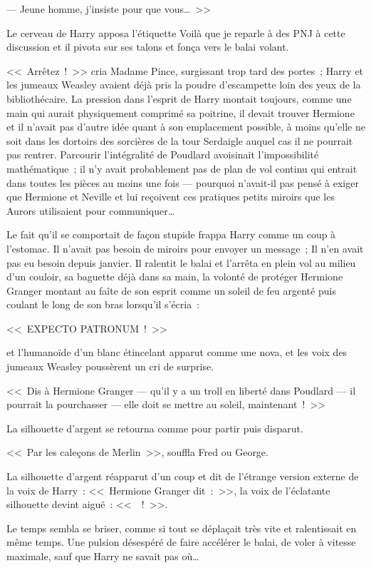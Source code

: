 --- Jeune homme, j'insiste pour que vous…~>>

Le cerveau de Harry apposa l'étiquette Voilà que je reparle à des PNJ à cette discussion et il pivota sur ses talons et fonça vers le balai volant.

<<~Arrêtez~!~>> cria Madame Pince, surgissant trop tard des portes~; Harry et les jumeaux Weasley avaient déjà pris la poudre d'escampette loin des yeux de la bibliothécaire. La pression dans l'esprit de Harry montait toujours, comme une main qui aurait physiquement comprimé sa poitrine, il devait trouver Hermione et il n'avait pas d'autre idée quant à son emplacement possible, à moins qu'elle ne soit dans les dortoirs des sorcières de la tour Serdaigle auquel cas il ne pourrait pas rentrer. Parcourir l'intégralité de Poudlard avoisinait l'impossibilité mathématique~; il n'y avait probablement pas de plan de vol continu qui entrait dans toutes les pièces au moins une fois — pourquoi n'avait-il pas pensé à exiger que Hermione et Neville et lui reçoivent ces pratiques petits miroirs que les Aurors utilisaient pour communiquer…

Le fait qu'il se comportait de façon stupide frappa Harry comme un coup à l'estomac. Il n'avait pas besoin de miroirs pour envoyer un message~; Il n'en avait pas eu besoin depuis janvier. Il ralentit le balai et l'arrêta en plein vol au milieu d'un couloir, sa baguette déjà dans sa main, la volonté de protéger Hermione Granger montant au faîte de son esprit comme un soleil de feu argenté puis coulant le long de son bras lorsqu'il s'écria~:

<<~EXPECTO PATRONUM~!~>>

et l'humanoïde d'un blanc étincelant apparut comme une nova, et les voix des jumeaux Weasley poussèrent un cri de surprise.

<<~Dis à Hermione Granger — qu'il y a un troll en liberté dans Poudlard — il pourrait la pourchasser — elle doit se mettre au soleil, maintenant~!~>>

La silhouette d'argent se retourna comme pour partir puis disparut.

<<~Par les caleçons de Merlin~>>, souffla Fred ou George.

La silhouette d'argent réapparut d'un coup et dit de l'étrange version externe de la voix de Harry~: <<~Hermione Granger dit~:~>>, la voix de l'éclatante silhouette devint aiguë~: <<~~!~>>.

Le temps sembla se briser, comme si tout se déplaçait très vite et ralentissait en même temps. Une pulsion désespéré de faire accélérer le balai, de voler à vitesse maximale, sauf que Harry ne savait pas où…

